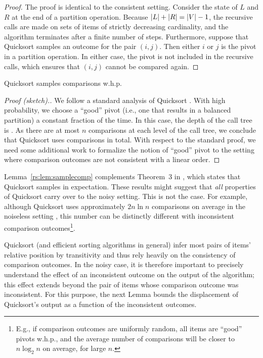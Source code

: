 \begin{proof}
The proof is identical to the consistent setting.
Consider the state of $L$ and $R$ at the end of a partition operation.
Because $\lvert L \rvert + \lvert R \rvert = \lvert V \rvert - 1$, the recursive calls are made on sets of items of strictly decreasing cardinality, and the algorithm terminates after a finite number of steps.
Furthermore, suppose that Quicksort samples an outcome for the pair $(i, j)$.
Then either $i$ or $j$ is the pivot in a partition operation.
In either case, the pivot is not included in the recursive calls, which ensures that $(i, j)$ cannot be compared again.
\end{proof}

\begin{lemma}
\label{rs:lem:samplecomp}
Quicksort samples  comparisons w.h.p.
\end{lemma}

\begin{proof}[Proof (sketch).]
We follow a standard analysis of Quicksort \citep[see, e.g.,][Section 3.3.3]{dubhashi2009concentration}.
With high probability, we choose a ``good'' pivot (i.e., one that results in a balanced partition) a constant fraction of the time.
In this case, the depth of the call tree is .
As there are at most $n$ comparisons at each level of the call tree, we conclude that Quicksort uses  comparisons in total.
With respect to the standard proof, we need some additional work to formalize the notion of ``good'' pivot to the setting where comparison outcomes are not consistent with a linear order.
\end{proof}

Lemma~\ref{rs:lem:samplecomp} complements Theorem~$3$ in \citet{ailon2010preference}, which states that Quicksort samples  in expectation.
These results might suggest that \emph{all} properties of Quicksort carry over to the noisy setting.
This is not the case.
For example, although Quicksort uses approximately $2n \ln n$ comparisons on average in the noiseless setting \citep{sedgewick2011algorithms}, this number can be distinctly different with inconsistent comparison outcomes\footnote{E.g., if comparison outcomes are uniformly random, all items are ``good'' pivots w.h.p., and the average number of comparisons will be closer to $n \log_2 n$ on average, for large $n$.}.

Quicksort (and efficient sorting algorithms in general) infer most pairs of items' relative position by transitivity and thus rely heavily on the consistency of comparison outcomes.
In the noisy case, it is therefore important to precisely understand the effect of an inconsistent outcome on the output of the algorithm; this effect extends beyond the pair of items whose comparison outcome was inconsistent.
For this purpose, the next Lemma bounds the displacement of Quicksort's output as a function of the inconsistent outcomes.

